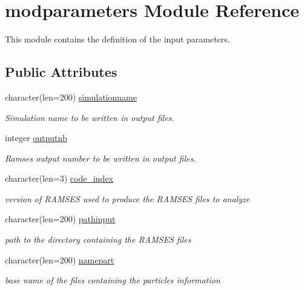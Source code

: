 \hypertarget{classmodparameters}{\section{modparameters Module Reference}
\label{classmodparameters}
}


This module contains the definition of the input parameters.  


\subsection*{Public Attributes}
\begin{DoxyCompactItemize}
\item 
character(len=200) \hyperlink{classmodparameters_a8e3087ed26ddd977f3b7214948ebf62b}{simulationname}
\begin{DoxyCompactList}\small\item\em Simulation name to be written in output files. \end{DoxyCompactList}\item 
integer \hyperlink{classmodparameters_a87dfe1d42999b2cfebdae2ca4e3671f6}{outputnb}
\begin{DoxyCompactList}\small\item\em Ramses output number to be written in output files. \end{DoxyCompactList}\item 
character(len=3) \hyperlink{classmodparameters_ac0cde1e01b079fda34684162c34a2ac9}{code\-\_\-index}
\begin{DoxyCompactList}\small\item\em version of R\-A\-M\-S\-E\-S used to produce the R\-A\-M\-S\-E\-S files to analyze \end{DoxyCompactList}\item 
character(len=200) \hyperlink{classmodparameters_afd21f9138d2720f8990c6e62a65457be}{pathinput}
\begin{DoxyCompactList}\small\item\em path to the directory containing the R\-A\-M\-S\-E\-S files \end{DoxyCompactList}\item 
character(len=200) \hyperlink{classmodparameters_a2c7cfce7809c8ff9dc10ab6db6d99cc0}{namepart}
\begin{DoxyCompactList}\small\item\em base name of the files containing the particles information \end{DoxyCompactList}\item 

\end{DoxyCompactItemize}
